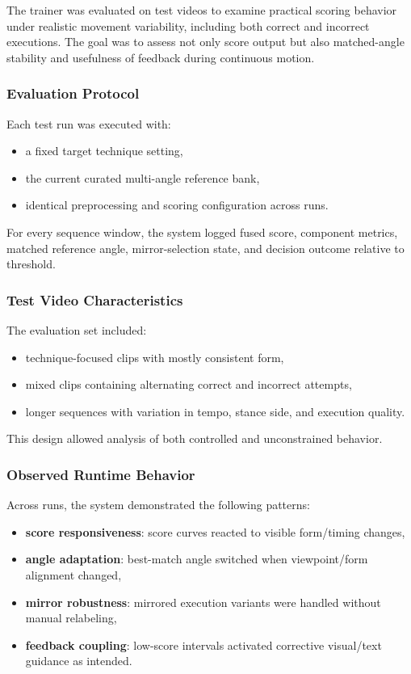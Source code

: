 \documentclass[12pt]{article}
\begin{document}
{The trainer was evaluated on test videos to examine practical scoring behavior under realistic movement variability, including both correct and incorrect executions. The goal was to assess not only score output but also matched-angle stability and usefulness of feedback during continuous motion.

\subsubsection{Evaluation Protocol}

Each test run was executed with:

\begin{itemize}
    \item a fixed target technique setting,
    \item the current curated multi-angle reference bank,
    \item identical preprocessing and scoring configuration across runs.
\end{itemize}

For every sequence window, the system logged fused score, component metrics, matched reference angle, mirror-selection state, and decision outcome relative to threshold.

\subsubsection{Test Video Characteristics}

The evaluation set included:

\begin{itemize}
    \item technique-focused clips with mostly consistent form,
    \item mixed clips containing alternating correct and incorrect attempts,
    \item longer sequences with variation in tempo, stance side, and execution quality.
\end{itemize}

This design allowed analysis of both controlled and unconstrained behavior.

\subsubsection{Observed Runtime Behavior}

Across runs, the system demonstrated the following patterns:

\begin{itemize}
    \item \textbf{score responsiveness}: score curves reacted to visible form/timing changes,
    \item \textbf{angle adaptation}: best-match angle switched when viewpoint/form alignment changed,
    \item \textbf{mirror robustness}: mirrored execution variants were handled without manual relabeling,
    \item \textbf{feedback coupling}: low-score intervals activated corrective visual/text guidance as intended.
\end{itemize}

}
\end{document}
